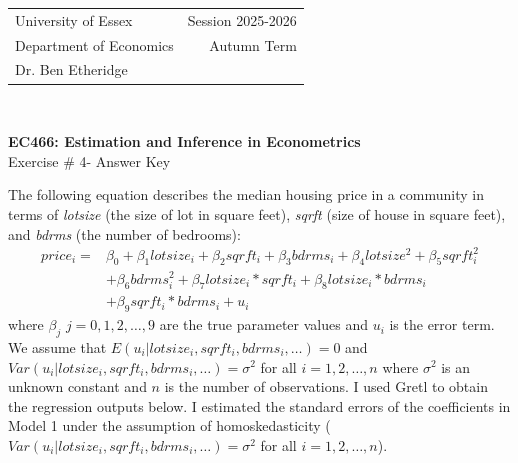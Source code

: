 \documentclass[12pt,a4paper]{article}
\begin{document}
\begin{tabular}{l r}
University of Essex  \hspace{35ex}& Session 2025-2026 \\
Department of Economics \hspace{35ex} & Autumn Term\\
Dr. Ben Etheridge \hspace{35ex} &
\end{tabular}
\\
\begin{center}
\large{\textbf{EC466: Estimation and Inference in Econometrics }\\
Exercise \# 4- Answer Key}
\end{center}
\vspace*{0.5cm}


The following equation describes the median housing price in a community in terms of \emph{lotsize} (the size of lot in square feet), \emph{sqrft} (size of house in square feet), and \emph{bdrms} (the number of bedrooms):
\begin{align}
\label{eq:nonlog}
price_{i}=&\beta_{0}+\beta_{1}lotsize_{i}+\beta_{2}sqrft_{i}+\beta_{3}bdrms_{i}+\beta_{4}lotsize^{2}+\beta_{5}sqrft^{2}_{i}\\
&+\beta_{6}bdrms^{2}_{i}+\beta_{7}lotsize_{i}*sqrft_{i}+\beta_{8}lotsize_{i}*bdrms_{i} \nonumber\\
&+\beta_{9}sqrft_{i}*bdrms_{i}+u_{i}\nonumber
\end{align}
where $\beta_{j}$ $j=0,1,2,\dots,9$ are the true parameter values and $u_{i}$ is the error term. We assume that $E(u_{i}|lotsize_{i}, sqrft_{i}, bdrms_{i}, \dots)=0$ and $Var(u_{i}| lotsize_{i}, sqrft_{i}, bdrms_{i}, \dots)=\sigma^{2}$ for all $i=1,2,\dots,n$ where $\sigma^{2}$ is an unknown constant and $n$ is the number of observations. I used Gretl to obtain the regression outputs below. I estimated the standard errors of the coefficients in Model 1 under the assumption of homoskedasticity ($Var(u_{i}| lotsize_{i}, sqrft_{i}, bdrms_{i}, \dots)=\sigma^{2}$ for all $i=1,2,\dots,n$). 
\end{document}
